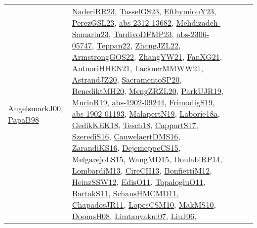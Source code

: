 {\begin{longtable}{lp{3cm}>{\raggedright}p{6cm}>{\raggedright}p{6cm}p{8cm}}
\href{papers/AngelsmarkJ00.pdf}{AngelsmarkJ00}\cite{AngelsmarkJ00}, \href{articles/PapaB98.pdf}{PapaB98}\cite{PapaB98} & \href{articles/NaderiRR23.pdf}{NaderiRR23}\cite{NaderiRR23}, \href{papers/TasselGS23.pdf}{TasselGS23}\cite{TasselGS23}, \href{papers/EfthymiouY23.pdf}{EfthymiouY23}\cite{EfthymiouY23}, \href{papers/PerezGSL23.pdf}{PerezGSL23}\cite{PerezGSL23}, \href{articles/abs-2312-13682.pdf}{abs-2312-13682}\cite{abs-2312-13682}, \href{papers/Mehdizadeh-Somarin23.pdf}{Mehdizadeh-Somarin23}\cite{Mehdizadeh-Somarin23}, \href{papers/TardivoDFMP23.pdf}{TardivoDFMP23}\cite{TardivoDFMP23}, \href{articles/abs-2306-05747.pdf}{abs-2306-05747}\cite{abs-2306-05747}, \href{papers/Teppan22.pdf}{Teppan22}\cite{Teppan22}, \href{papers/ZhangJZL22.pdf}{ZhangJZL22}\cite{ZhangJZL22}, \href{papers/ArmstrongGOS22.pdf}{ArmstrongGOS22}\cite{ArmstrongGOS22}, \href{articles/ZhangYW21.pdf}{ZhangYW21}\cite{ZhangYW21}, \href{articles/FanXG21.pdf}{FanXG21}\cite{FanXG21}, \href{papers/AntuoriHHEN21.pdf}{AntuoriHHEN21}\cite{AntuoriHHEN21}, \href{papers/LacknerMMWW21.pdf}{LacknerMMWW21}\cite{LacknerMMWW21}, \href{articles/AstrandJZ20.pdf}{AstrandJZ20}\cite{AstrandJZ20}, \href{articles/SacramentoSP20.pdf}{SacramentoSP20}\cite{SacramentoSP20}, \href{articles/BenediktMH20.pdf}{BenediktMH20}\cite{BenediktMH20}, \href{articles/MengZRZL20.pdf}{MengZRZL20}\cite{MengZRZL20}, \href{papers/ParkUJR19.pdf}{ParkUJR19}\cite{ParkUJR19}, \href{papers/MurinR19.pdf}{MurinR19}\cite{MurinR19}, \href{articles/abs-1902-09244.pdf}{abs-1902-09244}\cite{abs-1902-09244}, \href{papers/FrimodigS19.pdf}{FrimodigS19}\cite{FrimodigS19}, \href{articles/abs-1902-01193.pdf}{abs-1902-01193}\cite{abs-1902-01193}, \href{papers/MalapertN19.pdf}{MalapertN19}\cite{MalapertN19}, \href{papers/Laborie18a.pdf}{Laborie18a}\cite{Laborie18a}, \href{articles/GedikKEK18.pdf}{GedikKEK18}\cite{GedikKEK18}, \href{papers/Tesch18.pdf}{Tesch18}\cite{Tesch18}, \href{papers/CappartS17.pdf}{CappartS17}\cite{CappartS17}, \href{papers/SzerediS16.pdf}{SzerediS16}\cite{SzerediS16}, \href{papers/CauwelaertDMS16.pdf}{CauwelaertDMS16}\cite{CauwelaertDMS16}, \href{articles/ZarandiKS16.pdf}{ZarandiKS16}\cite{ZarandiKS16}, \href{papers/DejemeppeCS15.pdf}{DejemeppeCS15}\cite{DejemeppeCS15}, \href{papers/MelgarejoLS15.pdf}{MelgarejoLS15}\cite{MelgarejoLS15}, \href{articles/WangMD15.pdf}{WangMD15}\cite{WangMD15}, \href{papers/DoulabiRP14.pdf}{DoulabiRP14}\cite{DoulabiRP14}, \href{papers/LombardiM13.pdf}{LombardiM13}\cite{LombardiM13}, \href{papers/CireCH13.pdf}{CireCH13}\cite{CireCH13}, \href{papers/BonfiettiM12.pdf}{BonfiettiM12}\cite{BonfiettiM12}, \href{articles/HeinzSSW12.pdf}{HeinzSSW12}\cite{HeinzSSW12}, \href{papers/EdisO11.pdf}{EdisO11}\cite{EdisO11}, \href{articles/TopalogluO11.pdf}{TopalogluO11}\cite{TopalogluO11}, \href{articles/BartakS11.pdf}{BartakS11}\cite{BartakS11}, \href{articles/SchausHMCMD11.pdf}{SchausHMCMD11}\cite{SchausHMCMD11}, \href{papers/ChapadosJR11.pdf}{ChapadosJR11}\cite{ChapadosJR11}, \href{articles/LopesCSM10.pdf}{LopesCSM10}\cite{LopesCSM10}, \href{papers/MakMS10.pdf}{MakMS10}\cite{MakMS10}, \href{papers/DoomsH08.pdf}{DoomsH08}\cite{DoomsH08}, \href{papers/Limtanyakul07.pdf}{Limtanyakul07}\cite{Limtanyakul07}, \href{papers/LiuJ06.pdf}{LiuJ06}\cite{LiuJ06}, 
\end{longtable}}
